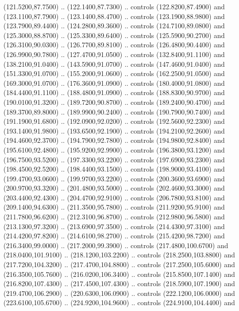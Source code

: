 {\begin{scope}[y=0.80pt, x=0.80pt, yscale=-1, xscale=1, inner sep=0pt, outer sep=0pt, #1]
      (121.5200,87.7500) .. (122.1400,87.7300) .. controls (122.8200,87.4900) and
      (123.1100,87.7900) .. (123.1400,88.4700) .. controls (123.1900,88.9800) and
      (123.7900,89.4400) .. (124.2800,89.3600) .. controls (124.7100,89.0800) and
      (125.3000,88.8700) .. (125.3300,89.6400) .. controls (125.5900,90.2700) and
      (126.3100,90.0300) .. (126.7700,89.8100) .. controls (126.4800,90.4400) and
      (126.9900,90.7800) .. (127.4700,91.0500) .. controls (132.8400,91.1100) and
      (138.2100,91.0400) .. (143.5900,91.0700) .. controls (147.4600,91.0400) and
      (151.3300,91.0700) .. (155.2000,91.0600) .. controls (162.2500,91.0500) and
      (169.3000,91.0700) .. (176.3600,91.0900) .. controls (180.4000,91.0800) and
      (184.4400,91.1100) .. (188.4800,91.0900) .. controls (188.8300,90.9700) and
      (190.0100,91.3200) .. (189.7200,90.8700) .. controls (189.2400,90.4700) and
      (189.3700,89.8000) .. (189.9900,90.2400) .. controls (190.7900,90.7400) and
      (191.1900,91.6800) .. (192.0900,92.0200) .. controls (192.5600,92.2300) and
      (193.1400,91.9800) .. (193.6500,92.1900) .. controls (194.2100,92.2600) and
      (194.4600,92.3700) .. (194.7900,92.7800) .. controls (194.9800,92.8400) and
      (195.6100,92.4800) .. (195.9200,92.9900) .. controls (196.3800,93.1200) and
      (196.7500,93.5200) .. (197.3300,93.2200) .. controls (197.6900,93.2300) and
      (198.4500,92.5200) .. (198.4400,93.1500) .. controls (198.9000,93.4100) and
      (199.4700,93.0600) .. (199.9700,93.2200) .. controls (200.3600,93.6900) and
      (200.9700,93.3200) .. (201.4800,93.5000) .. controls (202.4600,93.3000) and
      (203.4400,92.4300) .. (204.4700,92.9100) .. controls (206.7800,93.8100) and
      (209.1400,94.6300) .. (211.3500,95.7800) .. controls (211.9200,95.9100) and
      (211.7800,96.6200) .. (212.3100,96.8700) .. controls (212.9800,96.5800) and
      (213.1300,97.3200) .. (213.6900,97.3500) .. controls (214.4300,97.3100) and
      (214.4200,97.8200) .. (214.6100,98.2700) .. controls (215.4200,98.7200) and
      (216.3400,99.0000) .. (217.2000,99.3900) .. controls (217.4800,100.6700) and
      (218.0400,101.9100) .. (218.1200,103.2200) .. controls (218.2500,103.8800) and
      (217.7200,104.3200) .. (217.4700,104.8800) .. controls (217.2500,105.6000) and
      (216.3500,105.7600) .. (216.0200,106.3400) .. controls (215.8500,107.1400) and
      (216.8200,107.4300) .. (217.4500,107.4300) .. controls (218.5900,107.1900) and
      (219.4700,106.2900) .. (220.6300,106.0900) .. controls (222.1200,106.0000) and
      (223.6100,105.6700) .. (224.9200,104.9600) .. controls (224.9100,104.4400) and

\end{scope}}
